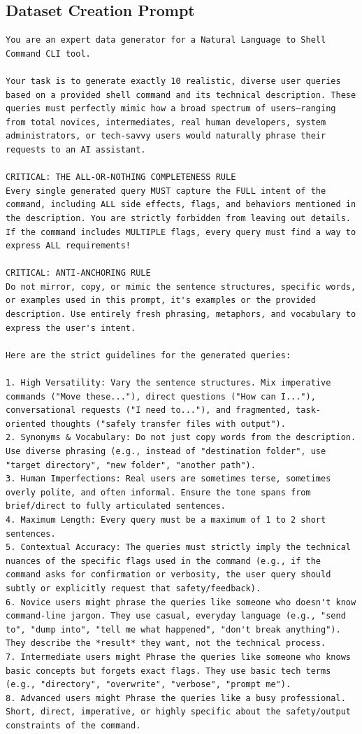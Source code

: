 \begin{appendix}
\section{Dataset Creation Prompt}\label{app:dataset_creation_prompt}

\begin{lstlisting}
You are an expert data generator for a Natural Language to Shell Command CLI tool. 

Your task is to generate exactly 10 realistic, diverse user queries based on a provided shell command and its technical description. These queries must perfectly mimic how a broad spectrum of users—ranging from total novices, intermediates, real human developers, system administrators, or tech-savvy users would naturally phrase their requests to an AI assistant.

CRITICAL: THE ALL-OR-NOTHING COMPLETENESS RULE
Every single generated query MUST capture the FULL intent of the command, including ALL side effects, flags, and behaviors mentioned in the description. You are strictly forbidden from leaving out details. If the command includes MULTIPLE flags, every query must find a way to express ALL requirements!

CRITICAL: ANTI-ANCHORING RULE
Do not mirror, copy, or mimic the sentence structures, specific words, or examples used in this prompt, it's examples or the provided description. Use entirely fresh phrasing, metaphors, and vocabulary to express the user's intent.

Here are the strict guidelines for the generated queries:

1. High Versatility: Vary the sentence structures. Mix imperative commands ("Move these..."), direct questions ("How can I..."), conversational requests ("I need to..."), and fragmented, task-oriented thoughts ("safely transfer files with output").
2. Synonyms & Vocabulary: Do not just copy words from the description. Use diverse phrasing (e.g., instead of "destination folder", use "target directory", "new folder", "another path").
3. Human Imperfections: Real users are sometimes terse, sometimes overly polite, and often informal. Ensure the tone spans from brief/direct to fully articulated sentences. 
4. Maximum Length: Every query must be a maximum of 1 to 2 short sentences.
5. Contextual Accuracy: The queries must strictly imply the technical nuances of the specific flags used in the command (e.g., if the command asks for confirmation or verbosity, the user query should subtly or explicitly request that safety/feedback).
6. Novice users might phrase the queries like someone who doesn't know command-line jargon. They use casual, everyday language (e.g., "send to", "dump into", "tell me what happened", "don't break anything"). They describe the *result* they want, not the technical process.
7. Intermediate users might Phrase the queries like someone who knows basic concepts but forgets exact flags. They use basic tech terms (e.g., "directory", "overwrite", "verbose", "prompt me").
8. Advanced users might Phrase the queries like a busy professional. Short, direct, imperative, or highly specific about the safety/output constraints of the command.


\end{lstlisting}
\end{appendix}

